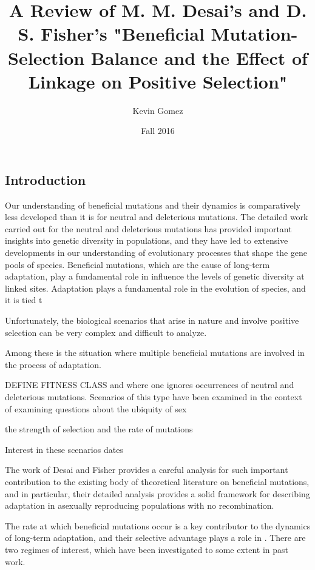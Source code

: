 \documentclass[12pt]{article}
\title{A Review of M. M. Desai's and D. S. Fisher's "Beneficial Mutation-Selection Balance and the Effect of Linkage on Positive Selection"}
\date{Fall 2016}
\author{Kevin Gomez}
\begin{document}
\maketitle
\newpage


\newpage
\subsection*{Introduction}
Our understanding of beneficial mutations and their dynamics is comparatively less developed than it is for neutral and deleterious mutations.  The detailed work carried out for the neutral and deleterious mutations has provided important insights into genetic diversity in populations, and they have led to extensive developments in our understanding of evolutionary processes that shape the gene pools of species.  Beneficial mutations, which are the cause of long-term adaptation, play a fundamental role in  influence the levels of genetic diversity at linked sites.  Adaptation plays a fundamental role in the evolution of species, and it is tied t

Unfortunately, the biological scenarios that arise in nature and involve positive selection can be very complex and difficult to analyze.    

Among these is the situation where multiple beneficial mutations are involved in the process of adaptation.

DEFINE FITNESS CLASS
 and where one ignores occurrences of neutral and deleterious mutations.  Scenarios of this type have been examined in the context of examining questions about the ubiquity of sex

the strength of selection and the rate of mutations  

Interest in these scenarios dates   

The work of Desai and Fisher provides a careful analysis for such important contribution to the existing body of theoretical literature on beneficial mutations, and in particular, their detailed analysis provides a solid framework for describing adaptation in asexually reproducing populations with no recombination.

The rate at which beneficial mutations occur is a key contributor to the dynamics of long-term adaptation, and their selective advantage plays a role in .  There are two regimes of interest, which have been investigated to some extent in past work.  
\end{document}
